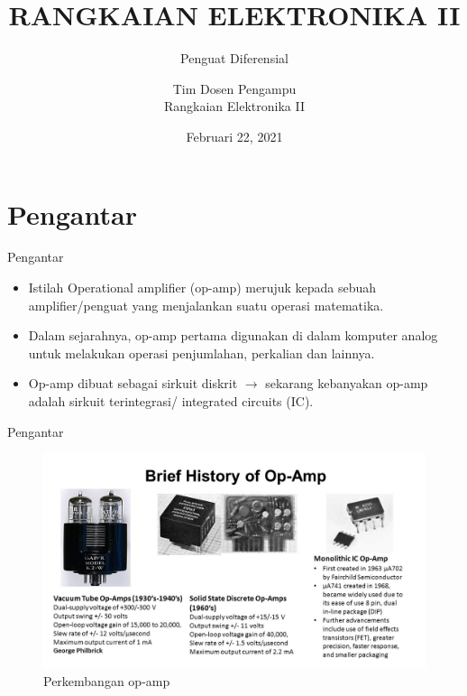 \documentclass[aspectratio=169]{beamer}
\author{Tim Dosen Pengampu \\
	Rangkaian Elektronika II}
\title{RANGKAIAN ELEKTRONIKA II}
\subtitle{Penguat Diferensial}
\institute{Teknik Elektro \\ Institut Teknologi Kalimantan \\ Balikpapan, Indonesia}
\date{\tiny Februari 22, 2021}
\begin{document}
\begin{frame}[t,plain]
\titlepage
\end{frame}


\section{Pengantar}
\begin{frame}{Pengantar}
	\begin{itemize}
		\item Istilah Operational amplifier (op-amp) merujuk kepada sebuah amplifier/penguat yang menjalankan suatu operasi matematika.
		\item Dalam sejarahnya, op-amp pertama digunakan di dalam komputer analog untuk melakukan operasi penjumlahan, perkalian dan lainnya.
		\item Op-amp dibuat sebagai sirkuit diskrit $ \rightarrow $ sekarang kebanyakan op-amp adalah sirkuit terintegrasi/ integrated circuits (IC). 
	\end{itemize}
\end{frame}

\begin{frame}{Pengantar}
	\begin{figure}
		\centering
		\includegraphics[height=0.75\textheight]{gambar/01.history-op-amp}
		\caption{Perkembangan op-amp}
		\label{fig:history-op-amp}
	\end{figure}
\end{frame}
\end{document}
